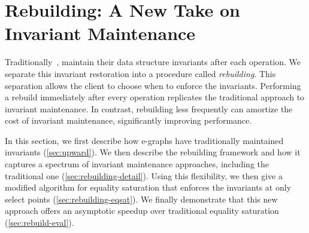 \section{Rebuilding: A New Take on \Egraph Invariant Maintenance}
\label{sec:rebuild}
\label{sec:rebuilding}

Traditionally~\cite{nelson, simplify},
  \egraphs maintain their data structure invariants
  after each operation.
We separate this invariant restoration into a procedure called \textit{rebuilding}.
This separation allows the client to
  choose when to enforce the \egraph invariants.
Performing a rebuild immediately after every operation replicates the
  traditional approach to invariant maintenance.
In contrast, rebuilding less frequently can amortize the cost of invariant
  maintenance, significantly improving performance.

In this section, we first describe how e-graphs have
  traditionally maintained invariants (\autoref{sec:upward}).
We then describe the rebuilding framework and how it captures a spectrum of
  invariant maintenance approaches, including the traditional one
  (\autoref{sec:rebuilding-detail}).
Using this flexibility, we then give a modified algorithm for equality
  saturation that enforces the \egraph invariants at only select points
  (\autoref{sec:rebuilding-eqsat}).
We finally demonstrate that this new approach offers an asymptotic speedup over
  traditional equality saturation (\autoref{sec:rebuild-eval}).






